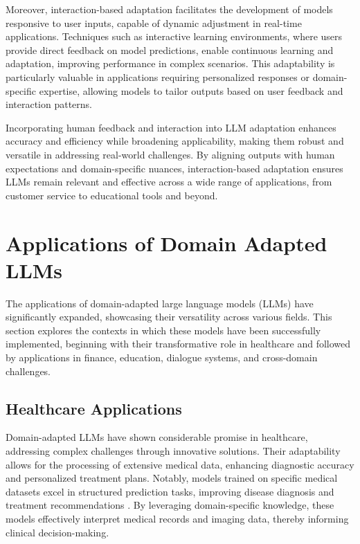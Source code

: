 Moreover, interaction-based adaptation facilitates the development of models responsive to user inputs, capable of dynamic adjustment in real-time applications. Techniques such as interactive learning environments, where users provide direct feedback on model predictions, enable continuous learning and adaptation, improving performance in complex scenarios. This adaptability is particularly valuable in applications requiring personalized responses or domain-specific expertise, allowing models to tailor outputs based on user feedback and interaction patterns.

Incorporating human feedback and interaction into LLM adaptation enhances accuracy and efficiency while broadening applicability, making them robust and versatile in addressing real-world challenges. By aligning outputs with human expectations and domain-specific nuances, interaction-based adaptation ensures LLMs remain relevant and effective across a wide range of applications, from customer service to educational tools and beyond.











\section{Applications of Domain Adapted LLMs} \label{sec:Applications of Domain Adapted LLMs}

The applications of domain-adapted large language models (LLMs) have significantly expanded, showcasing their versatility across various fields. This section explores the contexts in which these models have been successfully implemented, beginning with their transformative role in healthcare and followed by applications in finance, education, dialogue systems, and cross-domain challenges.


\subsection{Healthcare Applications} \label{subsec:Healthcare Applications}

Domain-adapted LLMs have shown considerable promise in healthcare, addressing complex challenges through innovative solutions. Their adaptability allows for the processing of extensive medical data, enhancing diagnostic accuracy and personalized treatment plans. Notably, models trained on specific medical datasets excel in structured prediction tasks, improving disease diagnosis and treatment recommendations \cite{gao2023benefitslabeldescriptiontrainingzeroshot}. By leveraging domain-specific knowledge, these models effectively interpret medical records and imaging data, thereby informing clinical decision-making.

